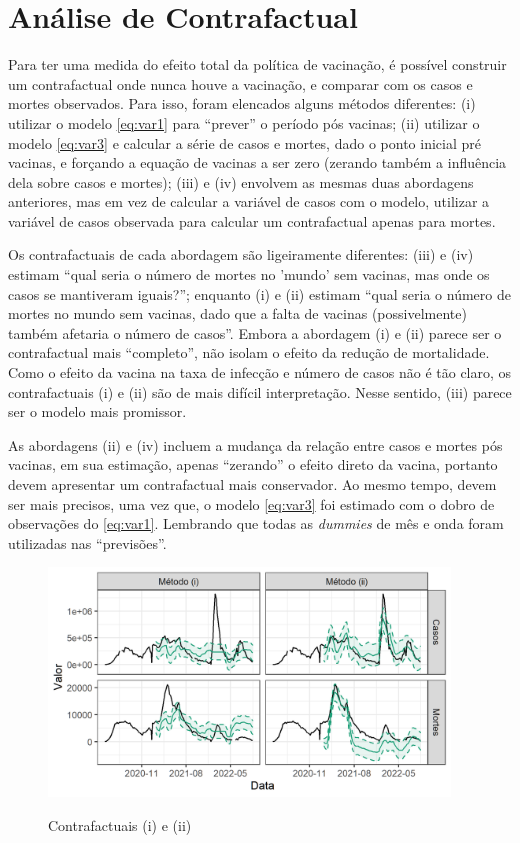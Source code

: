 \documentclass[
	12pt,				%
	oneside,			%
	a4paper,			%
	english,			%
	brazil				%
	hyperref = {colorlinks, citecolor=c1d, linkcolor=c2d, urlcolor=c3d, colorlinks}
	]{abntex2}
\begin{document}
\section{Análise de Contrafactual}\label{sec:res2}
Para ter uma medida do efeito total da política de vacinação, é possível construir um contrafactual onde nunca houve a vacinação, e comparar com os casos e mortes observados. Para isso, foram elencados alguns métodos diferentes: (i) utilizar o modelo \eqref{eq:var1} para ``prever'' o período pós vacinas; (ii) utilizar o modelo \eqref{eq:var3} e calcular a série de casos e mortes, dado o ponto inicial pré vacinas, e forçando a equação de vacinas a ser zero (zerando também a influência dela sobre casos e mortes); (iii) e (iv) envolvem as mesmas duas abordagens anteriores, mas em vez de calcular a variável de casos com o modelo, utilizar a variável de casos observada para calcular um contrafactual apenas para mortes.


Os contrafactuais de cada abordagem são ligeiramente diferentes: (iii) e (iv) estimam ``qual seria o número de mortes no 'mundo' sem vacinas, mas onde os casos se mantiveram iguais?''; enquanto (i) e (ii) estimam ``qual seria o número de mortes no mundo sem vacinas, dado que a falta de vacinas (possivelmente) também afetaria o número de casos''. Embora a abordagem (i) e (ii) parece ser o contrafactual mais ``completo'', não isolam o efeito da redução de mortalidade. Como o efeito da vacina na taxa de infecção e número de casos não é tão claro, os contrafactuais (i) e (ii) são de mais difícil interpretação. Nesse sentido, (iii) parece ser o modelo mais promissor.

As abordagens (ii) e (iv) incluem a mudança da relação entre casos e mortes pós vacinas, em sua estimação, apenas ``zerando'' o efeito direto da vacina, portanto devem apresentar um contrafactual mais conservador. Ao mesmo tempo, devem ser mais precisos, uma vez que, o modelo \eqref{eq:var3} foi estimado com o dobro de observações do \eqref{eq:var1}. Lembrando que todas as \textit{dummies} de mês e onda foram utilizadas nas ``previsões''.

\begin{figure}[H]
    \centering
    \caption{Contrafactuais (i) e (ii)}
    \includegraphics[width = 0.95\textwidth]{Figuras/counterfactual.png}
    \label{fig:counter1}
\end{figure}
\end{document}
